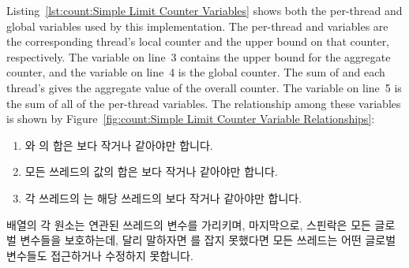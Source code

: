 Listing~\ref{lst:count:Simple Limit Counter Variables}
shows both the per-thread and global variables used by this
implementation.
The per-thread  and  variables are the
corresponding thread's local counter and the upper bound on that
counter, respectively.
The  variable on line~3 contains the upper
bound for the aggregate counter, and the  variable
on line~4 is the global counter.
The sum of  and each thread's  gives
the aggregate value of the overall counter.
The  variable on line~5 is the sum of all of the
per-thread  variables.
The relationship among these variables is shown by
Figure~\ref{fig:count:Simple Limit Counter Variable Relationships}:
\fi
\begin{enumerate}
\item	{} 와  의 합은  보다
	작거나 같아야만 합니다.
\item	모든 쓰레드의  값의 합은  보다 작거나
	같아야만 합니다.
\item	각 쓰레드의  는 해당 쓰레드의  보다 작거나
	같아야만 합니다.

\end{enumerate}

 배열의 각 원소는 연관된 쓰레드의  변수를 가리키며,
마지막으로,  스핀락은 모든 글로벌 변수들을 보호하는데, 달리
말하자면  를 잡지 못했다면 모든 쓰레드는 어떤 글로벌 변수들도
접근하거나 수정하지 못합니다.

